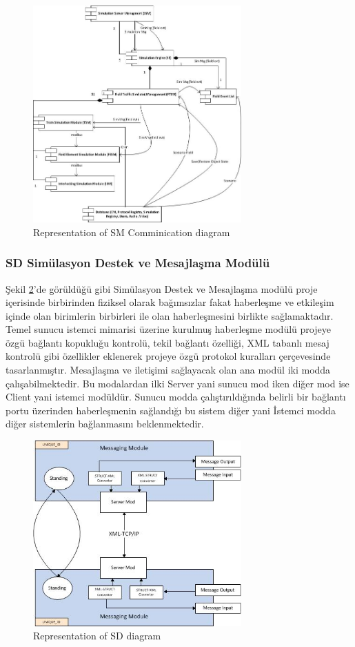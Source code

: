 \documentclass[conference]{IEEEtran}
\begin{document}
\begin{figure}[h!]
  \centering
  \includegraphics[width=8cm]{smCommunicationDiagram.jpg}
  \caption{Representation of SM Comminication diagram}\label{fig:smCommunicationDiagram}
\end{figure}

\subsubsection{SD Simülasyon Destek ve Mesajlaşma Modülü}

Şekil \ref{fig:RepresentationSDDiagram}'de görüldüğü gibi Simülasyon Destek ve Mesajlaşma modülü proje içerisinde birbirinden fiziksel olarak bağımsızlar fakat haberleşme ve etkileşim içinde olan birimlerin birbirleri ile olan haberleşmesini birlikte sağlamaktadır.
Temel sunucu istemci mimarisi üzerine kurulmuş haberleşme modülü projeye özgü bağlantı kopukluğu kontrolü, tekil bağlantı özelliği, XML tabanlı mesaj kontrolü gibi özellikler eklenerek projeye özgü protokol kuralları çerçevesinde tasarlanmıştır.
Mesajlaşma ve iletişimi sağlayacak olan ana modül iki modda çalışabilmektedir. Bu modalardan ilki Server yani sunucu mod iken diğer mod ise Client yani istemci modüldür. Sunucu modda çalıştırıldığında belirli bir bağlantı portu üzerinden haberleşmenin sağlandığı bu sistem diğer yani İstemci modda diğer sistemlerin bağlanmasını beklenmektedir.  

\begin{figure}[h!]
  \centering
  \includegraphics[width=8cm]{RepresentationSDDiagram.jpg}
  \caption{Representation of SD  diagram}\label{fig:RepresentationSDDiagram}
\end{figure}
\end{document}
